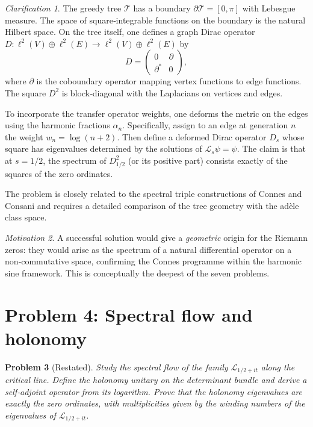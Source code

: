 \documentclass[11pt,a4paper]{article}
\newtheorem{problem}{Problem}[section]
\theoremstyle{remark}
\newtheorem{clarification}[problem]{Clarification}
\newtheorem{motivation}[problem]{Motivation}
\newcommand{\cL}{\mathcal{L}}
\begin{document}
\begin{clarification}
The greedy tree $\mathcal{T}$ has a boundary $\partial\mathcal{T}=[0,\pi]$ with Lebesgue measure. The space of square‑integrable functions on the boundary is the natural Hilbert space. On the tree itself, one defines a graph Dirac operator $D:\ell^2(V)\oplus\ell^2(E)\to\ell^2(V)\oplus\ell^2(E)$ by
\[
D = \begin{pmatrix} 0 & \partial \\ \partial^* & 0 \end{pmatrix},
\]
where $\partial$ is the coboundary operator mapping vertex functions to edge functions. The square $D^2$ is block‑diagonal with the Laplacians on vertices and edges.

To incorporate the transfer operator weights, one deforms the metric on the edges using the harmonic fractions $\alpha_n$. Specifically, assign to an edge at generation $n$ the weight $w_n = \log(n+2)$. Then define a deformed Dirac operator $D_s$ whose square has eigenvalues determined by the solutions of $\cL_s\psi=\psi$. The claim is that at $s=1/2$, the spectrum of $D_{1/2}^2$ (or its positive part) consists exactly of the squares of the zero ordinates.

The problem is closely related to the spectral triple constructions of Connes and Consani \cite{ConnesConsani} and requires a detailed comparison of the tree geometry with the ad\`ele class space.
\end{clarification}

\begin{motivation}
A successful solution would give a \emph{geometric} origin for the Riemann zeros: they would arise as the spectrum of a natural differential operator on a non‑commutative space, confirming the Connes programme within the harmonic sine framework. This is conceptually the deepest of the seven problems.
\end{motivation}

\section{Problem 4: Spectral flow and holonomy}

\begin{problem}[Restated]
Study the spectral flow of the family $\cL_{1/2+it}$ along the critical line. Define the holonomy unitary on the determinant bundle and derive a self‑adjoint operator from its logarithm. Prove that the holonomy eigenvalues are exactly the zero ordinates, with multiplicities given by the winding numbers of the eigenvalues of $\cL_{1/2+it}$.
\end{problem}
\end{document}
